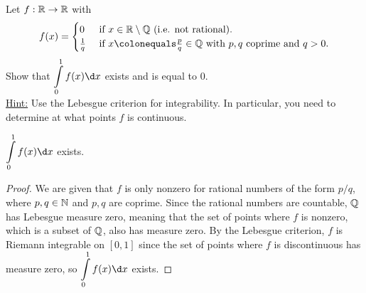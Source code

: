 \begin{problem}
  Let $f : \mathbb{R} \to \mathbb{R}$ with
    \[
      f(x) = \begin{cases}
        0 & \text{ if } x \in \R \setminus \Q \text{ (i.e. not rational).}\\
        \frac{1}{q} & \text{ if } x \colonequals \frac{p}{q} \in \Q
        \text{ with $p, q$ coprime and $q > 0$}.
      \end{cases}
    \]
  Show that $\displaystyle \int\limits_0^1 f(x) \d x$ exists and is equal to $0$.\\
  \underline{Hint:} Use the Lebesgue criterion for integrability.
    In particular, you need to determine at what points $f$ is continuous.
\end{problem}

\begin{answer}
  \begin{claim}
    $\displaystyle \int\limits_0^1 f(x) \d x$ exists.
    \begin{proof}
      We are given that $f$ is only nonzero for rational numbers of the form $p/q$,
      where $p, q \in \mathbb{N}$ and $p, q$ are coprime.
      Since the rational numbers are countable, $\mathbb{Q}$ has Lebesgue measure zero,
      meaning that the set of points where $f$ is nonzero,
      which is a subset of $\mathbb{Q}$, also has measure zero.
      By the Lebesgue criterion, $f$ is Riemann integrable on $[0, 1]$
      since the set of points where $f$ is discontinuous has measure zero,
      so $\displaystyle \int\limits_0^1 f(x) \d x$ exists.
    \end{proof}
  \end{claim}


\end{answer}

